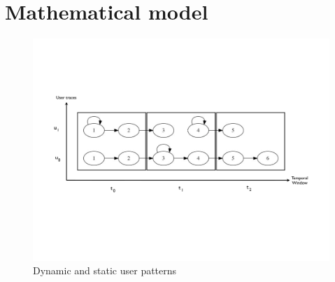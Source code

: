 \newpage

\section{Mathematical model}

\begin{figure}[h]
\begin{center}
\includegraphics[scale =0.5] {mathematical_definition/images/dynamic_users.pdf}
\caption{Dynamic and static user patterns}
\label{fig:matehematical_model}
\end{center}
\end{figure}


